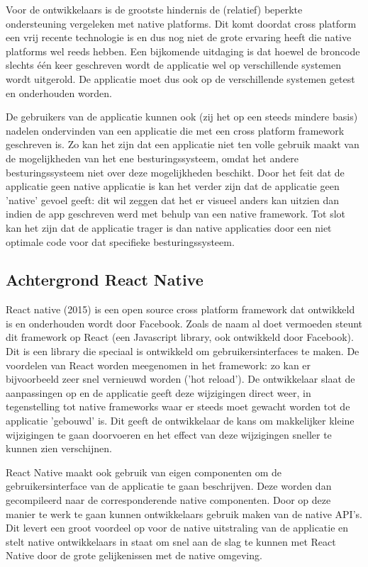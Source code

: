 Voor de ontwikkelaars is de grootste hindernis de (relatief) beperkte ondersteuning vergeleken met native platforms. Dit komt doordat cross platform een vrij recente technologie is en dus nog niet de grote ervaring heeft die native platforms wel reeds hebben. Een bijkomende uitdaging is dat hoewel de broncode slechts één keer geschreven wordt de applicatie wel op verschillende systemen wordt uitgerold. De applicatie moet dus ook op de verschillende systemen getest en onderhouden worden.

De gebruikers van de applicatie kunnen ook (zij het op een steeds mindere basis) nadelen ondervinden van een applicatie die met een cross platform framework geschreven is. Zo kan het zijn dat een applicatie niet ten volle gebruik maakt van de mogelijkheden van het ene besturingssysteem, omdat het andere besturingssysteem niet over deze mogelijkheden beschikt. Door het feit dat de applicatie geen native applicatie is kan het verder zijn dat de applicatie geen 'native' gevoel geeft: dit wil zeggen dat het er visueel anders kan uitzien dan indien de app geschreven werd met behulp van een native framework. Tot slot kan het zijn dat de applicatie trager is dan native applicaties door een niet optimale code voor dat specifieke besturingssysteem.

\subsection{Achtergrond React Native}

React native (2015) is een open source cross platform framework dat ontwikkeld is en onderhouden wordt door Facebook. Zoals de naam al doet vermoeden steunt dit framework op React (een Javascript library, ook ontwikkeld door Facebook). Dit is een library die speciaal is ontwikkeld om gebruikersinterfaces te maken. De voordelen van React worden meegenomen in het framework: zo kan er bijvoorbeeld zeer snel vernieuwd worden ('hot reload'). De ontwikkelaar slaat de aanpassingen op en de applicatie geeft deze wijzigingen direct weer, in tegenstelling tot native frameworks waar er steeds moet gewacht worden tot de applicatie 'gebouwd' is. Dit geeft de ontwikkelaar de kans om makkelijker kleine wijzigingen te gaan doorvoeren en het effect van deze wijzigingen sneller te kunnen zien verschijnen.

React Native maakt ook gebruik van eigen componenten om de gebruikersinterface van de applicatie te gaan beschrijven. Deze worden dan gecompileerd naar de corresponderende native componenten. Door op deze manier te werk te gaan kunnen ontwikkelaars gebruik maken van de native API's. Dit levert een groot voordeel op voor de native uitstraling van de applicatie en stelt native ontwikkelaars in staat om snel aan de slag te kunnen met React Native door de grote gelijkenissen met de native omgeving.

